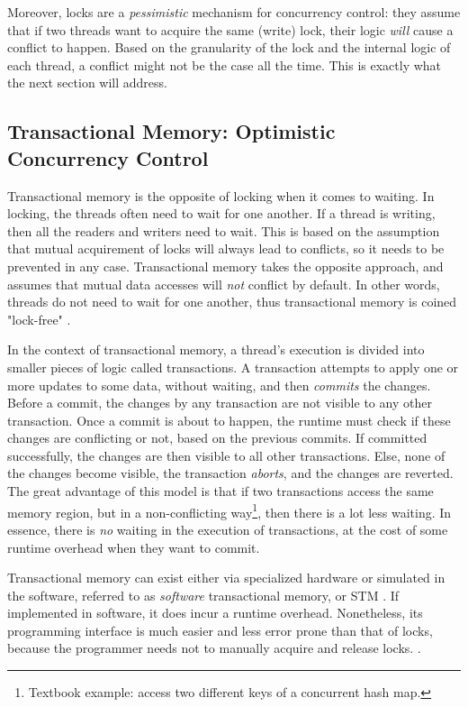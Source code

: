 Moreover, locks are a \textit{pessimistic} mechanism for concurrency control: they assume that if
two threads want to acquire the same (write) lock, their logic \textit{will} cause a conflict to
happen. Based on the granularity of the lock and the internal logic of each thread, a conflict might
not be the case all the time. This is exactly what the next section will address.

\subsection{Transactional Memory: Optimistic Concurrency Control} \label{chap_bg:subsec:stm}

Transactional memory is the opposite of locking when it comes to waiting. In locking, the threads
often need to wait for one another. If a thread is writing, then all the readers and writers need to
wait. This is based on the assumption that mutual acquirement of locks will always lead to
conflicts, so it needs to be prevented in any case. Transactional memory takes the opposite
approach, and assumes that mutual data accesses will \textit{not} conflict by default. In other
words, threads do not need to wait for one another, thus transactional memory is coined "lock-free"
\cite{knightArchitectureMostlyFunctional1986}.

In the context of transactional memory, a thread's execution is divided into smaller pieces of logic
called transactions. A transaction attempts to apply one or more updates to some data, without
waiting, and then \textit{commits} the changes. Before a commit, the changes by any transaction are
not visible to any other transaction. Once a commit is about to happen, the runtime must check if
these changes are conflicting or not, based on the previous commits. If committed successfully, the
changes are then visible to all other transactions. Else, none of the changes become visible, the
transaction \textit{aborts}, and the changes are reverted. The great advantage of this model is that
if two transactions access the same memory region, but in a non-conflicting way\footnote{Textbook
example: access two different keys of a concurrent hash map.}, then there is a lot less waiting. In
essence, there is \textit{no} waiting in the execution of transactions, at the cost of some runtime
overhead when they want to commit.

Transactional memory can exist either via specialized hardware or simulated in the software,
referred to as \textit{software} transactional memory, or STM
\cite{hammondTransactionalMemoryCoherence2004}. If implemented in software, it does incur a runtime
overhead. Nonetheless, its programming interface is much easier and less error prone than that of
locks, because the programmer needs not to manually acquire and release locks.
\cite{herlihyTransactionalMemoryArchitectural1993}.

